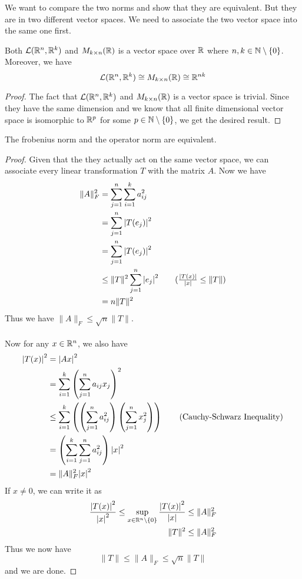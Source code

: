 \documentclass[a4paper]{article}
\begin{document}
We want to compare the two norms and show that they are equivalent. But they are in two different vector spaces. We need to associate the two vector space into the same one first. 

\begin{prp}{}{} Both $\mathcal{L}(\mathbb{R}^n,\mathbb{R}^k)$ and $M_{k\times n}(\mathbb{R})$ is a vector space over $\mathbb{R}$ where $n,k\in\mathbb{N}\setminus\{0\}$. Moreover, we have $$\mathcal{L}(\mathbb{R}^n,\mathbb{R}^k)\cong M_{k\times n}(\mathbb{R})\cong\mathbb{R}^{nk}$$ \tcbline
\begin{proof}
The fact that $\mathcal{L}(\mathbb{R}^n,\mathbb{R}^k)$ and $M_{k\times n}(\mathbb{R})$ is a vector space is trivial. Since they have the same dimension and we know that all finite dimensional vector space is isomorphic to $\mathbb{R}^p$ for some $p\in\mathbb{N}\setminus\{0\}$, we get the desired result. 
\end{proof}
\end{prp}

\begin{prp}{}{} The frobenius norm and the operator norm are equivalent. \tcbline
\begin{proof}
Given that the they actually act on the same vector space, we can associate every linear transformation $T$ with the matrix $A$. Now we have 
\begin{align*}
\|A\|_F^2&=\sum_{j=1}^n\sum_{i=1}^ka_{ij}^2\\
&=\sum_{j=1}^n\abs{T(e_j)}^2\\
&=\sum_{j=1}^n\abs{T(e_j)}^2\\
&\leq\|T\|^2\sum_{j=1}^n\abs{e_j}^2\tag{$\frac{\abs{T(x)}}{\abs{x}}\leq\|T\|$}\\
&=n\|T\|^2
\end{align*}
Thus we have $\|A\|_F\leq\sqrt{n}\|T\|$. \\~\\
Now for any $x\in\mathbb{R}^n$, we also have 
\begin{align*}
\abs{T(x)}^2&=\abs{Ax}^2\\
&=\sum_{i=1}^k\left(\sum_{j=1}^na_{ij}x_j\right)^2\\
&\leq\sum_{i=1}^k\left(\left(\sum_{j=1}^na_{ij}^2\right)\left(\sum_{j=1}^nx_j^2\right)\right)\tag{Cauchy-Schwarz Inequality}\\
&=\left(\sum_{i=1}^k\sum_{j=1}^na_{ij}^2\right)\abs{x}^2\\
&=\|A\|_F^2\abs{x}^2
\end{align*}
If $x\neq 0$, we can write it as 
\begin{align*}
\frac{\abs{T(x)}^2}{\abs{x}^2}\leq\sup_{x\in\mathbb{R}^n\setminus\{0\}}\frac{\abs{T(x)}^2}{\abs{x}}&\leq\|A\|_F^2\\
\|T\|^2&\leq\|A\|_F^2
\end{align*}
Thus we now have $$\|T\|\leq\|A\|_F\leq\sqrt{n}\|T\|$$ and we are done. 
\end{proof}
\end{prp}
\end{document}
